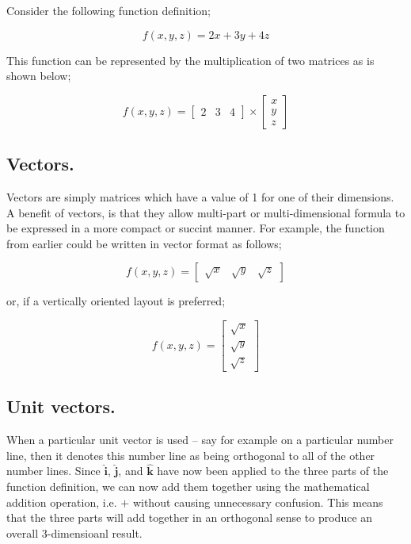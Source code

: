 \documentclass{article}
\begin{document}
Consider the following function definition;

\begin{equation*}
f(x,y,z) = 2x + 3y + 4z
\end{equation*}

This function can be represented by the multiplication of two matrices as is shown below;

\begin{equation*}
f(x,y,z)= 
\begin{bmatrix}
2 & 3 & 4
\end{bmatrix}
\times
\begin{bmatrix}
x \\
y \\
z
\end{bmatrix}
\end{equation*}

 
\subsection{Vectors.}

Vectors are simply matrices which have a value of 1 for one of their dimensions. A benefit of vectors, is that 
they allow multi-part or multi-dimensional formula to be expressed in a more compact or succint manner. For example,
the function from earlier could be written in vector format as follows;

\begin{equation*}
f(x,y,z) = 
\begin{bmatrix}
\sqrt{x} & \sqrt{y} & \sqrt{z}
\end{bmatrix}
\end{equation*}

or, if a vertically oriented layout is preferred;

\begin{equation*}
f(x,y,z) = 
\begin{bmatrix}
\sqrt{x} \\
\sqrt{y} \\
\sqrt{z}
\end{bmatrix}
\end{equation*}


\subsection{Unit vectors.}

When a particular unit vector is used -- say for example
on a particular number line, then it denotes this number line as being orthogonal to all of the other number lines.
Since $\hat{\mathrm{\bm{i}}}$, $\hat{\mathrm{\bm{j}}}$, and $\hat{\mathrm{\bm{k}}}$ have now been applied
to the three parts of the function definition, we can now add them together using the mathematical addition operation,
i.e. $+$ without causing unnecessary confusion. This means that the three parts will add together in an orthogonal
sense to produce an overall 3-dimensioanl result.\\
\end{document}
